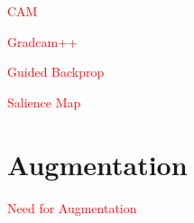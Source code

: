 \textcolor{red}{CAM}

\textcolor{red}{Gradcam++}

\textcolor{red}{Guided Backprop}

\textcolor{red}{Salience Map}

\section{Augmentation} \label{sec:augmentation}
\textcolor{red}{Need for Augmentation}






